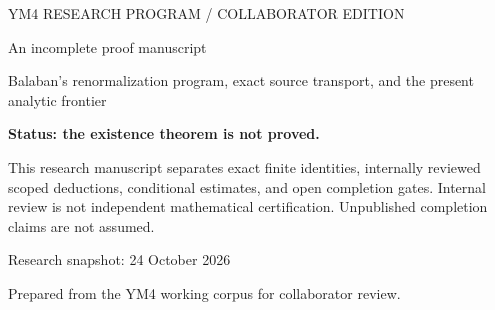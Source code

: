 \documentclass[11pt,a4paper]{article}
\theoremstyle{definition}\newtheorem{definition}[theorem]{Definition}\newtheorem{assumption}[theorem]{Assumption}
\theoremstyle{remark}\newtheorem{remark}[theorem]{Remark}
\begin{document}
\hypersetup{pageanchor=false}
\begin{titlepage}
\raggedright
\color{teal}\noindent\textsf{YM4 RESEARCH PROGRAM / COLLABORATOR EDITION}\par\vspace{2cm}
\color{black}{\Huge\bfseries Toward a nontrivial interacting four-dimensional Yang--Mills theory\par}\vspace{1cm}
{\Large An incomplete proof manuscript\par}\vspace{1.3cm}
{\large Balaban's renormalization program, exact source transport, and the present analytic frontier\par}\vfill
\noindent\textbf{Status: the existence theorem is not proved.}\par\medskip
\noindent This research manuscript separates exact finite identities, internally reviewed scoped deductions, conditional estimates, and open completion gates. Internal review is not independent mathematical certification. Unpublished completion claims are not assumed.\par\vspace{1cm}
\noindent Research snapshot: 24 October 2026\par
\noindent Prepared from the YM4 working corpus for collaborator review.\par
\end{titlepage}
\hypersetup{pageanchor=true}
\tableofcontents\newpage
{}

\end{document}
